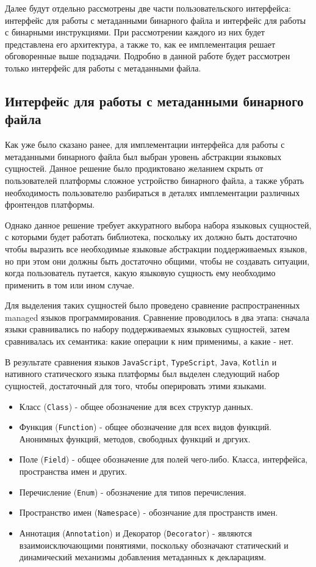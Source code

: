 Далее будут отдельно рассмотрены две части пользовательского интерфейса: интерфейс для работы с метаданными бинарного файла и интерфейс для работы с бинарными инструкциями. При рассмотрении каждого из них будет представлена его архитектура, а также то, как ее имплементация решает обговоренные выше подзадачи. Подробно в данной работе будет рассмотрен только интерфейс для работы с метаданными файла.

\subsection{Интерфейс для работы с метаданными бинарного файла}

Как уже было сказано ранее, для имплементации интерфейса для работы с метаданными бинарного файла был выбран уровень абстракции языковых сущностей. Данное решение было продиктовано желанием скрыть от пользователей платформы сложное устройство бинарного файла, а также убрать необходимость пользователю разбираться в деталях имплементации различных фронтендов платформы.

Однако данное решение требует аккуратного выбора набора языковых сущностей, с которыми будет работать библиотека, поскольку их должно быть достаточно чтобы выразить все необходимые языковые абстракции поддерживаемых языков, но при этом они должны быть достаточно общими, чтобы не создавать ситуации, когда пользователь путается, какую языковую сущность ему необходимо применить в том или ином случае.

Для выделения таких сущностей было проведено сравнение распространенных managed языков программирования. Сравнение проводилось в два этапа: сначала языки сравнивались по набору поддерживаемых языковых сущностей, затем сравнивалась их семантика: какие операции к ним применимы, а какие - нет.

В результате сравнения языков \texttt{JavaScript}, \texttt{TypeScript}, \texttt{Java}, \texttt{Kotlin} и нативного статического языка платформы был выделен следующий набор сущностей, достаточный для того, чтобы оперировать этими языками.

\begin{itemize}
    \item Класс (\texttt{Class}) - общее обозначение для всех структур данных.
    \item Функция (\texttt{Function}) - общее обозначение для всех видов функций. Анонимных функций, методов, свободных функций и дргуих.
    \item Поле (\texttt{Field}) - общее обозначение для полей чего-либо. Класса, интерфейса, пространства имен и других.
    \item Перечисление (\texttt{Enum}) - обозначение для типов перечисления.
    \item Пространство имен (\texttt{Namespace}) - обознчание для пространств имен.
    \item Аннотация (\texttt{Annotation}) и Декоратор (\texttt{Decorator}) - являются взаимоисключающими понятиями, поскольку обозначают статический и динамический механизмы добавления метаданных к декларациям.
\end{itemize}

